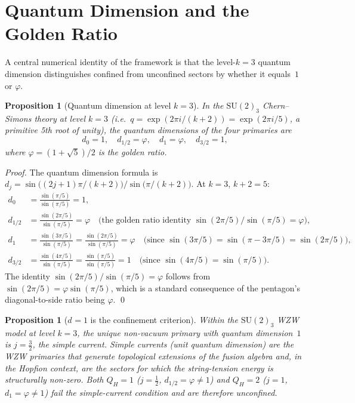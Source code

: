 \documentclass[11pt,a4paper]{article}
\newtheorem{proposition}[theorem]{Proposition}
\theoremstyle{definition}\newtheorem{definition}[theorem]{Definition}
\theoremstyle{remark}
\newcommand{\vp}{\varphi}
\newcommand{\SU}{\mathrm{SU}}
\newcommand{\QH}{Q_H}
\newcommand{\dimq}[1]{d_{#1}}
\begin{document}
\section{Quantum Dimension and the Golden Ratio}
\label{P17:sec:dimq}

A central numerical identity of the framework is that the level-$k=3$
quantum dimension distinguishes confined from unconfined sectors by
whether it equals~$1$ or $\vp$.

\begin{proposition}[Quantum dimension at level $k=3$]
\label{P17:prop:qh1_dimq}
In the $\SU(2)_3$ Chern--Simons theory at level $k=3$
(i.e.\ $q=\exp(2\pi i/(k+2))=\exp(2\pi i/5)$, a primitive 5th root of
unity), the quantum dimensions of the four primaries are
\[
  \dimq{0} = 1,
  \quad
  \dimq{1/2} = \vp,
  \quad
  \dimq{1} = \vp,
  \quad
  \dimq{3/2} = 1,
\]
where $\vp=(1+\sqrt5)/2$ is the golden ratio.
\end{proposition}

\begin{proof}
The quantum dimension formula is
$\dimq{j} = \sin\bigl((2j+1)\pi/(k+2)\bigr)/\sin\bigl(\pi/(k+2)\bigr)$.
At $k=3$, $k+2=5$:
\begin{align*}
  \dimq{0} &= \frac{\sin(\pi/5)}{\sin(\pi/5)} = 1,\\
  \dimq{1/2} &= \frac{\sin(2\pi/5)}{\sin(\pi/5)} = \vp
    \quad\text{(the golden ratio identity $\sin(2\pi/5)/\sin(\pi/5)=\vp$)},\\
  \dimq{1} &= \frac{\sin(3\pi/5)}{\sin(\pi/5)}
    = \frac{\sin(2\pi/5)}{\sin(\pi/5)} = \vp
    \quad\text{(since $\sin(3\pi/5)=\sin(\pi-3\pi/5)=\sin(2\pi/5)$)},\\
  \dimq{3/2} &= \frac{\sin(4\pi/5)}{\sin(\pi/5)}
    = \frac{\sin(\pi/5)}{\sin(\pi/5)} = 1
    \quad\text{(since $\sin(4\pi/5)=\sin(\pi/5)$)}.
\end{align*}
The identity $\sin(2\pi/5)/\sin(\pi/5)=\vp$ follows from
$\sin(2\pi/5)=\vp\sin(\pi/5)$, which is a standard consequence of
the pentagon's diagonal-to-side ratio being $\vp$.
\qed
\end{proof}

\begin{proposition}[$\dimq{}=1$ is the confinement criterion]
\label{P17:prop:dimq_confinement}
Within the $\SU(2)_3$ WZW model at level $k=3$, the unique non-vacuum
primary with quantum dimension~$1$ is $j=\tfrac32$, the simple
current. Simple currents (unit quantum dimension) are the WZW primaries
that generate topological extensions of the fusion algebra and,
in the Hopfion context, are the sectors for which the string-tension
energy is structurally non-zero. Both $\QH=1$ ($j=\tfrac12$,
$\dimq{1/2}=\vp\neq1$) and $\QH=2$ ($j=1$, $\dimq{1}=\vp\neq1$)
fail the simple-current condition and are therefore unconfined.
\end{proposition}
\end{document}
